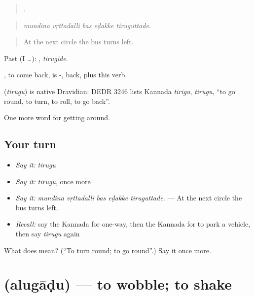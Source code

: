 \begin{quote}
    .
\end{quote}

\begin{quote}
\emph{mundina vṛttadalli bas eḍakke tiruguttade.}
\end{quote}

\begin{quote}
At the next circle the bus turns left.
\end{quote}

Past (I …): , \emph{tirugide}.

, to come back, is -, back, plus this verb.

\begin{cousinweb}
\textbf{} (\emph{tirugu}) is native Dravidian: DEDR 3246 lists Kannada \emph{tirigu}, \emph{tirugu}, \textquotedblleft{}to go round, to turn, to roll, to go back\textquotedblright{}.
\end{cousinweb}

\begin{grammarlens}[title={What you've built}]
One more word for getting around.
\end{grammarlens}

\subsection*{Your turn}
\begin{itemize}
\raggedright
  \item \emph{Say it:} \emph{tirugu}
  \item \emph{Say it:} \emph{tirugu}, once more
  \item \emph{Say it:} \emph{mundina vṛttadalli bas eḍakke tiruguttade.} — At the next circle the bus turns left.
  \item \emph{Recall:} say the Kannada for one-way, then the Kannada for to park a vehicle, then say \emph{tirugu} again
\end{itemize}

\begin{tcolorbox}[breakable,colback=teal!4,colframe=teal!35!black,title={Before you move on}]
What does  mean? (\textquotedblleft{}To turn round; to go round\textquotedblright{}.) Say it once more.
\end{tcolorbox}
\section[\texorpdfstring{\kn{ಅಲುಗಾಡು} (alugāḍu)}{ಅಲುಗಾಡು (alugāḍu)}]{ (alugāḍu) — to wobble; to shake}

